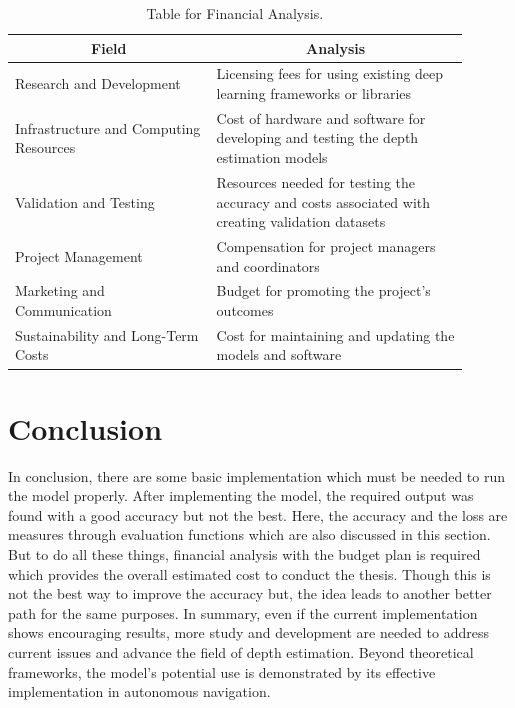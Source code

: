 \documentclass[a4paper,12pt,oneside]{book}
\begin{document}
\vline
\begin{table}[!htb]
\centering
\begin{threeparttable}
\captionsetup{font=small}
\caption{Table for Financial Analysis.}
\label{tab:test}
\small %

\begin{tabular}{|p{0.40\linewidth}|p{0.50\linewidth}|}
\hline
\multicolumn{1}{|c|}{\textbf{Field}} & \multicolumn{1}{c|}{\textbf{Analysis}} \\  
\hline
Research and Development & Licensing fees for using existing deep learning frameworks or libraries\\ \hline
Infrastructure and Computing Resources & Cost of hardware and software for developing and testing the depth estimation models \\ \hline
Validation and Testing & Resources needed for testing the accuracy and costs associated with creating validation datasets \\ \hline
Project Management & Compensation for project managers and coordinators \\ \hline
Marketing and Communication & Budget for promoting the project's outcomes \\ \hline
Sustainability and Long-Term Costs & Cost for maintaining and updating the models and software \\ \hline
\end{tabular}

\end{threeparttable}
\end{table}

\section{Conclusion}
In conclusion, there are some basic implementation which must be needed to run the model properly. After implementing the model, the required output was found with a good accuracy but not the best. Here, the accuracy and the loss are measures through evaluation functions which are also discussed in this section. But to do all these things, financial analysis with the budget plan is required which provides the overall estimated cost to conduct the thesis. Though this is not the best way to improve the accuracy but, the idea leads to another better path for the same purposes.
In summary, even if the current implementation shows encouraging results, more study and development are needed to address current issues and advance the field of depth estimation. Beyond theoretical frameworks, the model's potential use is demonstrated by its effective implementation in autonomous navigation.
\end{document}
